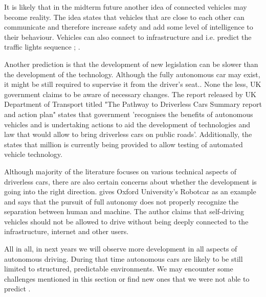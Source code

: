 \documentclass[11pt,english]{article}
\begin{document}
\par


It is likely that in the midterm future another idea of connected vehicles may become reality. The idea states that vehicles that are close to each other can communicate and therefore increase safety and add some level of intelligence to their behaviour. Vehicles can also connect to infrastructure and i.e. predict the traffic lights sequence \citep{narla2013evolution} ; \citep{luettel2012autonomous}.

\par
Another prediction is that the development of new legislation can be slower than the development of the technology. Although the fully autonomous car may exist, it might be still required to supervise it from the driver's seat.\citep{luettel2012autonomous}. None the less, UK government claims to be aware of necessary changes. The report released by UK Department of Transport titled "The Pathway to Driverless Cars Summary report and action plan" \citep{pathwaytodriverless} states that government 'recognises the benefits of autonomous vehicles and is undertaking actions to aid the development of technologies and law that would allow to bring driverless cars on public roads'. Additionally, the \citet{pathwaytodriverless2} states that  million is currently being provided  to allow testing of automated vehicle technology.

\par
Although majority of the literature focuses on various technical aspects of driverless cars, there are also certain concerns about whether the development is going into the right direction. \citet{mcbride2016ethics} gives Oxford University’s Robotcar as an example and  says that the pursuit of full autonomy does not properly recognize the separation between human and machine. The author claims that self-driving vehicles should not be allowed to drive without being deeply connected to the infrastructure, internet and other users.



\par
All in all, in next years we will observe more development in all aspects of autonomous driving. 
During that time autonomous cars are likely to be still limited to structured, predictable environments.
We may encounter some challenges mentioned in this section or find new ones that we were not able to predict \citep{luettel2012autonomous}.



\end{document}
